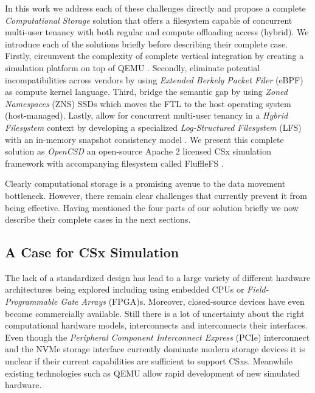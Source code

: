 
In this work we address each of these challenges directly and propose a
complete \textit{Computational Storage} solution that offers a filesystem
capable of concurrent multi-user tenancy with both regular and compute
offloading access (hybrid). We introduce each of the solutions briefly before
describing their complete case. Firstly, circumvent the complexity of
complete vertical integration by creating a simulation platform on top of
QEMU \cite{qemu}. Secondly, eliminate potential incompatibilities across
vendors by using \textit{Extended Berkely Packet Filer} (eBPF) \cite{what-ebpf}
as compute kernel language. Third, bridge the semantic gap by using \textit{
Zoned Namespaces} (ZNS) \cite{zns} SSDs which moves the FTL to the host
operating system (host-managed). Lastly, allow for concurrent multi-user
tenancy in a \textit{Hybrid Filesystem} context by developing a specialized
\textit{Log-Structured Filesystem} (LFS) \cite{Rosenblum1992TheDA} with an
in-memory snapshot consistency model \cite{Viotti2016ConsistencyIN}. We present
this complete solution as \textit{OpenCSD} an open-source Apache 2 licensed CSx
simulation framework with accompanying filesystem called
FluffleFS \cite{qemu-csd}.

Clearly computational storage is a promising avenue to the data movement
bottleneck. However, there remain clear challenges that currently prevent it
from being effective. Having mentioned the four parts of our solution briefly we
now describe their complete cases in the next sections.

\subsection{A Case for CSx Simulation}

The lack of a standardized design has lead to a large variety of different
hardware architectures being explored including using embedded CPUs or
\textit{Field-Programmable Gate Arrays} (FPGA)s. Moreover, closed-source
devices have even become commercially available. Still there is a lot of
uncertainty about the right computational hardware models, interconnects and
interconnects their interfaces. Even though the \textit{Peripheral Component
Interconnect Express} (PCIe) interconnect and the NVMe storage interface
currently dominate modern storage devices it is unclear if their current
capabilities are sufficient to support CSxs. Meanwhile existing technologies
such as QEMU allow rapid development of new simulated hardware.

